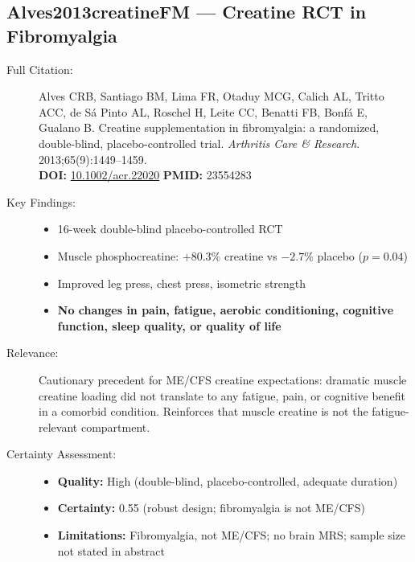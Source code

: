 \subsection*{Alves2013creatineFM --- Creatine RCT in Fibromyalgia}
\begin{description}
    \item[Full Citation:] Alves CRB, Santiago BM, Lima FR, Otaduy MCG, Calich AL, Tritto ACC, de S\'{a} Pinto AL, Roschel H, Leite CC, Benatti FB, Bonf\'{a} E, Gualano B. Creatine supplementation in fibromyalgia: a randomized, double-blind, placebo-controlled trial. \textit{Arthritis Care \& Research}. 2013;65(9):1449--1459.\\
    \textbf{DOI:} \href{https://doi.org/10.1002/acr.22020}{10.1002/acr.22020} \quad \textbf{PMID:} 23554283
    \item[Key Findings:]
    \begin{itemize}
        \item 16-week double-blind placebo-controlled RCT
        \item Muscle phosphocreatine: $+80.3\%$ creatine vs $-2.7\%$ placebo ($p = 0.04$)
        \item Improved leg press, chest press, isometric strength
        \item \textbf{No changes in pain, fatigue, aerobic conditioning, cognitive function, sleep quality, or quality of life}
    \end{itemize}
    \item[Relevance:] Cautionary precedent for ME/CFS creatine expectations: dramatic muscle creatine loading did not translate to any fatigue, pain, or cognitive benefit in a comorbid condition. Reinforces that muscle creatine is not the fatigue-relevant compartment.
    \item[Certainty Assessment:]
    \begin{itemize}
        \item \textbf{Quality:} High (double-blind, placebo-controlled, adequate duration)
        \item \textbf{Certainty:} 0.55 (robust design; fibromyalgia is not ME/CFS)
        \item \textbf{Limitations:} Fibromyalgia, not ME/CFS; no brain MRS; sample size not stated in abstract
    \end{itemize}
\end{description}

